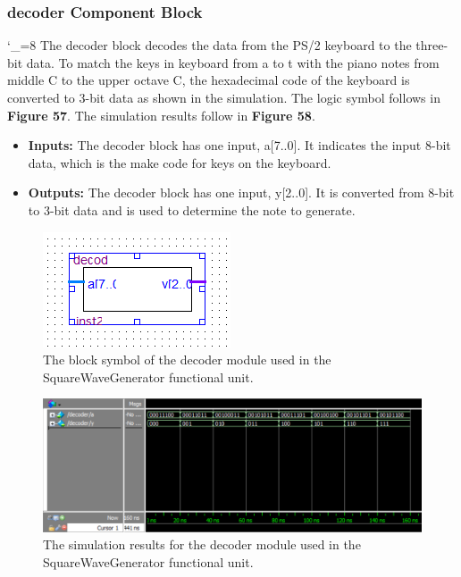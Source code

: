 \documentclass[a4paper]{article}
\begin{document}
\subsubsection{decoder Component Block}
\catcode`_=8
The decoder block decodes the data from the PS/2 keyboard to the three-bit data. To match the keys in keyboard from a to t with the piano notes from middle C to the upper octave C, the hexadecimal code of the keyboard is converted to 3-bit data as shown in the simulation.  The logic symbol follows in \textbf{Figure 57}.  The simulation results follow in \textbf{Figure 58}.
\begin{itemize}
\item \textbf{Inputs:  } The decoder block has one input, a[7..0]. It indicates the input 8-bit data, which is the make code for keys on the keyboard.
\item \textbf{Outputs: } The decoder block has one input, y[2..0]. It is converted from 8-bit to 3-bit data and is used to determine the note to generate.
\end{itemize}
\begin{figure}[h]
\centering
\includegraphics[width=.48\textwidth]{functional_units/SquareWaveGenerator/individual_blocks/decoder_symbol.png}
\caption{The block symbol of the decoder module used in the SquareWaveGenerator functional unit.}
\end{figure}
\begin{figure}[h]
\centering
\includegraphics[width=.98\textwidth]{functional_units/SquareWaveGenerator/individual_blocks/decoder_sim.png}
\caption{The simulation results for the decoder module used in the SquareWaveGenerator functional unit.}
\end{figure}
\clearpage
\end{document}
